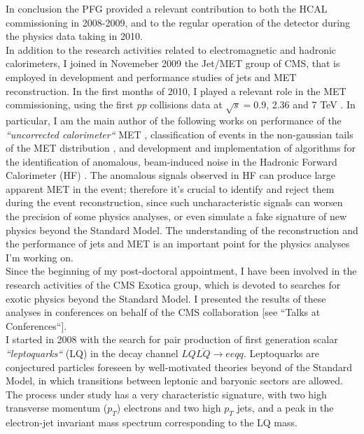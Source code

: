 \documentclass[10pt, a4paper]{article}
\begin{document}
In conclusion the PFG provided a relevant contribution to both the HCAL commissioning in 2008-2009, 
and to the regular operation of the detector during the physics data taking in 2010. \\

In addition to the research activities related to electromagnetic and hadronic calorimeters, I joined in Novemeber 2009 
the Jet/MET group of CMS, that is employed in development and performance studies of jets and MET reconstruction. 
In the first months of 2010, I played a relevant role in the MET commissioning, using the first {\it pp} collisions data 
at $\sqrt{s}=$0.9, 2.36 and 7 TeV \cite{JME-10-004,JME-10-002}. In particular, I am the main author of the following works 
on performance of the {\it ``uncorrected calorimeter``} MET \cite{AN-2010-029}, classification of events in the non-gaussian tails 
of the MET distribution \cite{AN-2010-219}, and development and implementation of algorithms for the identification 
of anomalous, beam-induced noise in the Hadronic Forward Calorimeter (HF) \cite{DN-2010-008}. The anomalous signals
observed in HF can produce large apparent MET in the event; therefore it's crucial to identify and reject them during the event reconstruction, 
since such uncharacteristic signals can worsen the precision of some physics analyses, or even simulate a fake signature 
of new physics beyond the Standard Model. The understanding of the reconstruction and the performance of jets and MET is 
an important point for the physics analyses I'm working on. \\

Since the beginning of my post-doctoral appointment, I have been involved in the research activities of the 
CMS Exotica group, which is devoted to searches for exotic physics beyond the Standard Model. I presented 
the results of these analyses in conferences on behalf of the CMS collaboration [see ``Talks at Conferences``]. \\

I started in 2008 with the search for pair production of  first generation scalar {\it ``leptoquarks``} (LQ) 
in the decay channel  $LQ\overline{LQ} \rightarrow ee qq$. Leptoquarks are conjectured particles
foreseen by well-motivated theories beyond of the Standard Model, in which transitions between 
leptonic and baryonic sectors are allowed. The process under study has a very characteristic signature, 
with two high transverse momentum ($p_T$) electrons and two high $p_T$ jets, and a peak in 
the electron-jet invariant mass spectrum corresponding to the LQ mass.
\end{document}
